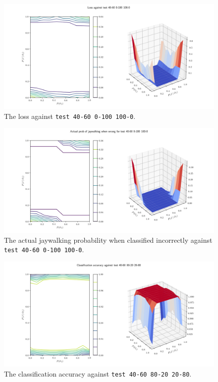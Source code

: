 \documentclass[]{report}
\newcommand{\code}{\texttt}
\begin{document}
\begin{figure}[h]
    \centering
    \centerline{\includegraphics[scale=0.55]{test_40-60_0-100_100-0_loss.png}}
    \caption[]{The loss against \code{test 40-60 0-100 100-0}.}
    \label{fig:test_40-60_0-100_100-0_loss_plot}
\end{figure}

\begin{figure}[h]
    \centering
    \centerline{\includegraphics[scale=0.55]{test_40-60_0-100_100-0_jay_prob.png}}
    \caption[]{The actual jaywalking probability when classified incorrectly against \code{test 40-60 0-100 100-0}.}
    \label{fig:test_40-60_0-100_100-0_jay_prob_plot}
\end{figure}

% 
% 

\begin{figure}[h]
    \centering
    \centerline{\includegraphics[scale=0.55]{test_40-60_80-20_20-80_accuracy.png}}
    \caption[]{The classification accuracy against \code{test 40-60 80-20 20-80}.}
    \label{fig:test_40-60_80-20_20-80_accuracy_plot}
\end{figure}
\end{document}

